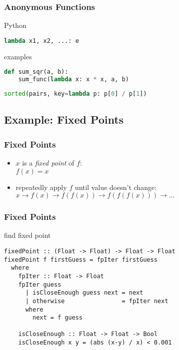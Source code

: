 \documentclass[dvipsnames]{beamer}
\theoremstyle{plain}
\begin{document}
\begin{frame}[fragile]
  \frametitle{Anonymous Functions}

  \begin{block}{Python}
    \begin{lstlisting}[language=Python, style=syntax]
lambda x1, x2, ...: e
    \end{lstlisting}
  \end{block}

  \medskip
  \begin{exampleblock}{examples}
    \begin{lstlisting}[language=Python]
def sum_sqr(a, b):
    sum_func(lambda x: x * x, a, b)
    \end{lstlisting}

    \pause
    \bigskip
    \begin{lstlisting}[language=Python]
sorted(pairs, key=lambda p: p[0] / p[1])
    \end{lstlisting}
  \end{exampleblock}
\end{frame}

\subsection{Example: Fixed Points}

\begin{frame}
  \frametitle{Fixed Points}

  \begin{itemize}
    \item $x$ is a \emph{fixed point} of $f$:\\
      $f(x)=x$

    \medskip
    \item repeatedly apply $f$ until value doesn't change:\\
      $x \rightarrow f(x) \rightarrow f(f(x)) \rightarrow f(f(f(x)))
      \rightarrow \ldots$
  \end{itemize}
\end{frame}

\begin{frame}[fragile]
  \frametitle{Fixed Points}

  \begin{exampleblock}{find fixed point}
    \begin{lstlisting}[deletekeywords={next}]
fixedPoint :: (Float -> Float) -> Float -> Float
fixedPoint f firstGuess = fpIter firstGuess
  where
    fpIter :: Float -> Float
    fpIter guess
      | isCloseEnough guess next = next
      | otherwise                = fpIter next
      where
        next = f guess

    isCloseEnough :: Float -> Float -> Bool
    isCloseEnough x y = (abs (x-y) / x) < 0.001
    \end{lstlisting}
  \end{exampleblock}
\end{frame}
\end{document}
